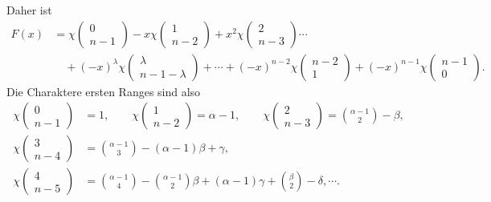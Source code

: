 \documentclass[11pt]{article}
\begin{document}
Daher ist
\begin{equation}\tag{2.}
\begin{aligned}
 F(x)&=\chi\left(\begin{matrix}0\\ n-1\end{matrix}\right)
 -x\chi\left(\begin{matrix}1\\ n-2\end{matrix}\right)
 +x^2\chi\left(\begin{matrix}2\\ n-3\end{matrix}\right)\cdots\\
 &\quad+(-x)^\lambda\chi\left(\begin{matrix}\lambda\\ n-1-
\lambda\end{matrix}\right)+\cdots+(-x)^{n-2}\chi\left(\begin{matrix}n-2\\1\end{matrix}\right)+(-x)^{n-1}\chi\left(\begin{matrix}n-1\\0\end{matrix}\right).
\end{aligned}
\end{equation}
Die Charaktere ersten Ranges sind also
\begin{equation}\tag{3.}
\begin{aligned}
\chi\left(\begin{matrix}0\\ n-1\end{matrix}\right)&=1,\qquad
\chi\left(\begin{matrix}1\\ n-2\end{matrix}\right)=\alpha-1,
\qquad
\chi\left(\begin{matrix}2\\ n-3\end{matrix}\right)=\binom{\alpha-1}{2}-\beta,\\
\chi\left(\begin{matrix}3\\ n-4\end{matrix}\right)&=\binom{\alpha-1}{3}-(\alpha-1)\beta+
\gamma,\\
\chi\left(\begin{matrix}4\\ n-5\end{matrix}\right)&=\binom{\alpha-1}{4}-\binom{\alpha-1}{2}\beta+(
\alpha-1)\gamma+
\binom{\beta}{2}-\delta,
\cdots.
\end{aligned}
\end{equation}
\end{document}
